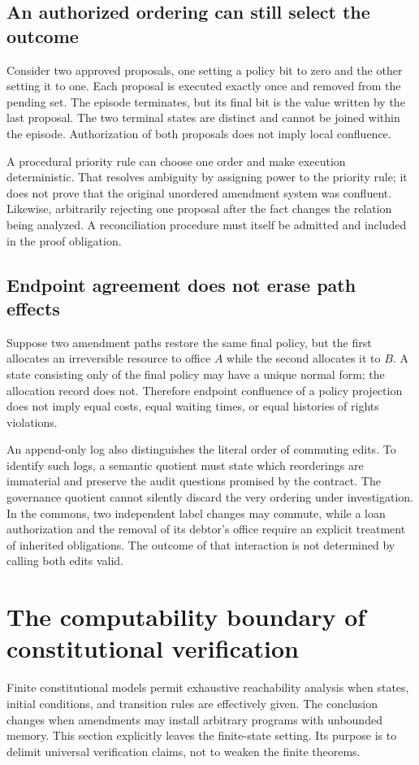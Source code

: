 \documentclass[11pt,letterpaper]{article}
\theoremstyle{plain}
\theoremstyle{definition}
\theoremstyle{remark}
\begin{document}
\subsection{An authorized ordering can still select the outcome}
Consider two approved proposals, one setting a policy bit to zero and the other setting it to one. Each proposal is executed exactly once and removed from the pending set. The episode terminates, but its final bit is the value written by the last proposal. The two terminal states are distinct and cannot be joined within the episode. Authorization of both proposals does not imply local confluence.

A procedural priority rule can choose one order and make execution deterministic. That resolves ambiguity by assigning power to the priority rule; it does not prove that the original unordered amendment system was confluent. Likewise, arbitrarily rejecting one proposal after the fact changes the relation being analyzed. A reconciliation procedure must itself be admitted and included in the proof obligation.

\subsection{Endpoint agreement does not erase path effects}
Suppose two amendment paths restore the same final policy, but the first allocates an irreversible resource to office $A$ while the second allocates it to $B$. A state consisting only of the final policy may have a unique normal form; the allocation record does not. Therefore endpoint confluence of a policy projection does not imply equal costs, equal waiting times, or equal histories of rights violations.

An append-only log also distinguishes the literal order of commuting edits. To identify such logs, a semantic quotient must state which reorderings are immaterial and preserve the audit questions promised by the contract. The governance quotient cannot silently discard the very ordering under investigation. In the commons, two independent label changes may commute, while a loan authorization and the removal of its debtor's office require an explicit treatment of inherited obligations. The outcome of that interaction is not determined by calling both edits valid.

\section{The computability boundary of constitutional verification}\label{sec:computability}
Finite constitutional models permit exhaustive reachability analysis when states, initial conditions, and transition rules are effectively given. The conclusion changes when amendments may install arbitrary programs with unbounded memory. This section explicitly leaves the finite-state setting. Its purpose is to delimit universal verification claims, not to weaken the finite theorems.
\end{document}
